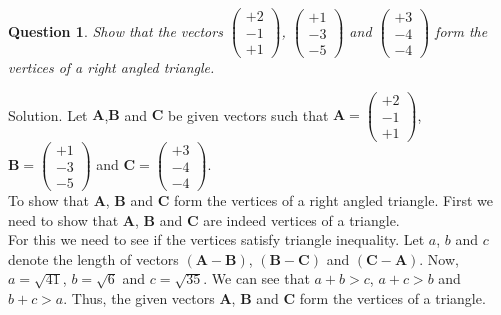 \documentclass{article}
\newtheorem{question}[theorem]{Question}
\newcommand{\vect}[1]{\boldsymbol{\mathbf{#1}}}
\begin{document}
\begin{question}
	Show that the vectors $\begin{pmatrix} 
		 +2\\-1\\+1 
	\end{pmatrix}$, $\begin{pmatrix} 
	 +1\\-3\\-5 
\end{pmatrix}$ and $\begin{pmatrix} 
+3\\-4\\-4 
\end{pmatrix}$ form the vertices of a right angled triangle.
\end{question}
Solution. Let $\vect{A}$,$\vect{B}$  and $\vect{C}$ be given vectors such that $\vect{A} =\begin{pmatrix} 
	+2\\-1\\+1 
\end{pmatrix}$,\\     
$\vect{B}= \begin{pmatrix} 
+1\\-3\\-5 
\end{pmatrix}$ and $\vect{C}= \begin{pmatrix} 
+3\\-4\\-4 
\end{pmatrix}$.\\
To show that $\vect{A}$, $\vect{B}$ and $\vect{C}$ form the vertices of a right angled triangle. First we need to show that $\vect{A}$, $\vect{B}$ and $\vect{C}$ are indeed vertices of a triangle.\\
For this we need to see if the vertices satisfy triangle inequality. Let $a$, $b$ and $c$ denote the length of vectors $(\vect{A}- \vect{B})$, $(\vect{B}-\vect{C})$ and $(\vect{C}- \vect{A})$. Now,\\
$a=\sqrt{41}$, $b=\sqrt{6}$ and $c=\sqrt{35}$. We can see that  $a+b>c$, 
$a+c>b$ and $b+c >a$. Thus, the given vectors $\vect{A}$, $\vect{B}$ and $\vect{C}$ form the vertices of a triangle.\\
\end{document}
